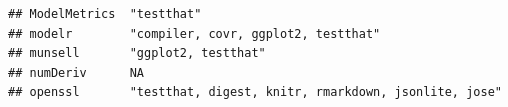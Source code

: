 \documentclass[]{article}
\begin{document}
\begin{verbatim}
## ModelMetrics  "testthat"                                                                                                                                                                                                                                                                                                                                                                                                                                                                                                                                                                                
## modelr        "compiler, covr, ggplot2, testthat"                                                                                                                                                                                                                                                                                                                                                                                                                                                                                                                                                       
## munsell       "ggplot2, testthat"                                                                                                                                                                                                                                                                                                                                                                                                                                                                                                                                                                       
## numDeriv      NA                                                                                                                                                                                                                                                                                                                                                                                                                                                                                                                                                                                        
## openssl       "testthat, digest, knitr, rmarkdown, jsonlite, jose"                                                                                                                                                                                                                                                                                                                                                                                                                                                                                                                                      

\end{verbatim}
\end{document}
